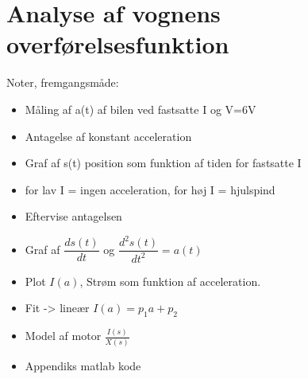 \section{Analyse af vognens overførelsesfunktion}\label{sec:sec_motoroverforelse}

Noter, fremgangsmåde:\\
\begin{itemize}
	\item Måling af a(t) af bilen ved fastsatte I og V=6V
	\item Antagelse af konstant acceleration
	\item Graf af s(t) position som funktion af tiden for fastsatte I
	\item for lav I = ingen acceleration, for høj I = hjulspind
	\item Eftervise antagelsen 
	\item Graf af $\dfrac{ds(t)}{dt}$ og $\dfrac{d^2s(t)}{dt^2} = a(t)$
	\item Plot $I(a)$, Strøm som funktion af acceleration.
	\item Fit -> lineær $I(a) = p_1 a + p_2$
	\item Model af motor $\frac{I(s)}{X(s)}$
	\item Appendiks matlab kode
\end{itemize}
